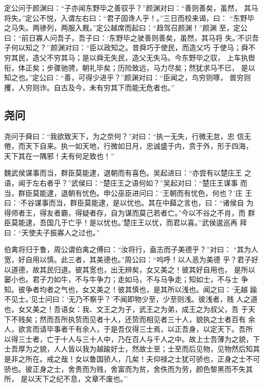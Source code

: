 \documentclass[]{article}
\begin{document}
定公问于颜渊曰：``子亦闻东野毕之善驭乎？''颜渊对曰：``善则善矣，虽然，
其马将失。''定公不悦，入谓左右曰：``君子固谗人乎！。''三日而校来谒，曰：
``东野毕之马失。两骖列，两服入厩。''定公越席而起曰：``趋驾召颜渊！''颜渊
至，定公曰：``前日寡人问吾子，吾子曰：`东野毕之驶善则善矣，虽然，其马将
失。'不识吾子何以知之？''颜渊对曰：``臣以政知之。昔舜巧于使民，而造父巧
于使马；舜不穷其民，造父不穷其马；是以舜无失民，造父无失马。今东野毕之驭，
上车执辔衔，体正矣；步骤驰骋，朝礼毕矣；历险致远，马力尽矣；然犹求马不已，
是以知之也。''定公曰：``善，可得少进乎？''颜渊对曰：``臣闻之，鸟穷则啄，
兽穷则攫，人穷则诈。自古及今，未有穷其下而能无危者也。''

\hypertarget{header-n136}{%
\subsection{尧问}\label{header-n136}}

尧问于舜曰：``我欲致天下，为之奈何？''对曰：``执一无失，行微无怠，忠
信无倦，而天下自来。执一如天地，行微如日月，忠诚盛于内，贲于外，形于四海，
天下其在一隅邪！夫有何足致也！''

魏武侯谋事而当，群臣莫能逮，退朝而有喜色。吴起进曰：``亦尝有以楚庄王
之语，闻于左右者乎？''武侯曰：``楚庄王之语何如？''吴起对曰：``楚庄王谋事
而当，群臣莫能逮，退朝有忧色。申公巫臣进问曰：`王朝而有忧色，何也？'庄
王曰：`不谷谋事而当，群臣莫能逮，是以忧也。其在中蘬之言也，曰：``诸侯自
为得师者王，得友者霸，得疑者存，自为谋而莫己若者亡。''今以不谷之不肖，而
群臣莫能逮，吾国几于亡乎！是以忧也。'楚庄王以忧，而君以喜。''武侯逡巡再
拜曰：``天使夫子振寡人之过也。''

伯禽将归于鲁，周公谓伯禽之傅曰：``汝将行，盍志而子美德乎？''对曰：
``其为人宽，好自用以慎。此三者，其美德也。''周公曰：``呜呼！以人恶为美德
乎？君子好以道德，故其民归道。彼其宽也，出无辨矣，女又美之！彼其好自用也，
是所以窭小也。君子力如牛，不与牛争力；走如马，不与马争走；知如士，不与士
争知。彼争者均者之气也，女又美之！彼其慎也，是其所以浅也。闻之曰：`无越
踰不见士。'见士问曰：`无乃不察乎？'不闻即物少至，少至则浅。彼浅者，贱
人之道也，女又美之！吾语女：我、文王之为子，武王之为弟，成王之为叔父，吾
于天下不贱矣；然而吾所执贽而见者十人，还贽而相见者三十人，貌执之士者百有
余人，欲言而请毕事者千有余人，于是吾仅得三士焉，以正吾身，以定天下。吾所
以得三士者，亡于十人与三十人中，乃在百人与千人之中。故上士吾薄为之貌，下
士吾厚为之貌，人人皆以我为越踰好士，然故士至；士至而后见物，见物然后知其
是非之所在。戒之哉！女以鲁国骄人，几矣！夫仰禄之士犹可骄也，正身之士不可
骄也。彼正身之士，舍贵而为贱，舍富而为贫，舍佚而为劳，颜色黎黑而不失其所，
是以天下之纪不息，文章不废也。''
\end{document}
